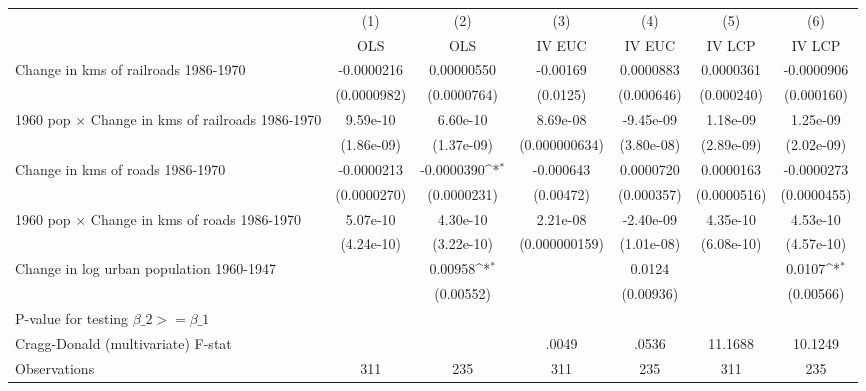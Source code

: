 {
\def\sym#1{\ifmmode^{#1}\else\(^{#1}\)\fi}
\begin{tabular}{l*{6}{c}}
\hline\hline
                &\multicolumn{1}{c}{(1)}&\multicolumn{1}{c}{(2)}&\multicolumn{1}{c}{(3)}&\multicolumn{1}{c}{(4)}&\multicolumn{1}{c}{(5)}&\multicolumn{1}{c}{(6)}\\
                &\multicolumn{1}{c}{OLS}&\multicolumn{1}{c}{OLS}&\multicolumn{1}{c}{IV EUC}&\multicolumn{1}{c}{IV EUC}&\multicolumn{1}{c}{IV LCP}&\multicolumn{1}{c}{IV LCP}\\
\hline
Change in kms of railroads 1986-1970&-0.0000216         &0.00000550         & -0.00169         &0.0000883         &0.0000361         &-0.0000906         \\
                &(0.0000982)         &(0.0000764)         & (0.0125)         &(0.000646)         &(0.000240)         &(0.000160)         \\
[1em]
1960 pop $\times$ Change in kms of railroads 1986-1970& 9.59e-10         & 6.60e-10         & 8.69e-08         &-9.45e-09         & 1.18e-09         & 1.25e-09         \\
                &(1.86e-09)         &(1.37e-09)         &(0.000000634)         &(3.80e-08)         &(2.89e-09)         &(2.02e-09)         \\
[1em]
Change in kms of roads 1986-1970&-0.0000213         &-0.0000390\sym{*}  &-0.000643         &0.0000720         &0.0000163         &-0.0000273         \\
                &(0.0000270)         &(0.0000231)         &(0.00472)         &(0.000357)         &(0.0000516)         &(0.0000455)         \\
[1em]
1960 pop $\times$ Change in kms of roads 1986-1970& 5.07e-10         & 4.30e-10         & 2.21e-08         &-2.40e-09         & 4.35e-10         & 4.53e-10         \\
                &(4.24e-10)         &(3.22e-10)         &(0.000000159)         &(1.01e-08)         &(6.08e-10)         &(4.57e-10)         \\
[1em]
Change in log urban population 1960-1947&                  &  0.00958\sym{*}  &                  &   0.0124         &                  &   0.0107\sym{*}  \\
                &                  &(0.00552)         &                  &(0.00936)         &                  &(0.00566)         \\
\hline
P-value for testing $\beta\_{2} >= \beta\_{1}$&                  &                  &                  &                  &                  &                  \\
Cragg-Donald (multivariate) F-stat&                  &                  &    .0049         &    .0536         &  11.1688         &  10.1249         \\
Observations    &      311         &      235         &      311         &      235         &      311         &      235         \\
\hline\hline
\end{tabular}
}
